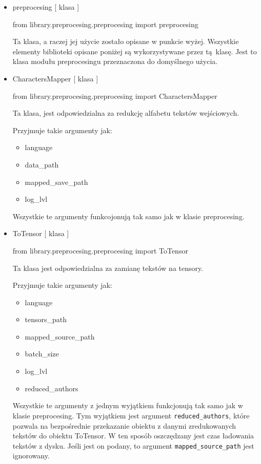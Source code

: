 \begin{itemize}
	
\item  {preprocesing [ klasa ] }
\begin{import}
from library.preprocesing.preprocesing import preprocesing
\end{import}

Ta klasa, a raczej jej użycie zostało opisane w punkcie wyżej. Wszystkie elementy biblioteki opisane
poniżej są wykorzystywane przez tą klasę. Jest to klasa modułu preprocesingu przeznaczona
do domyślnego użycia.

\item  {CharactersMapper [ klasa ] }
\begin{import}
from library.preprocesing.preprocesing import CharactersMapper
\end{import}
Ta klasa, jest odpowiedzialna za redukcję alfabetu tekstów wejściowych. 

Przyjmuje takie argumenty jak: 

\begin{itemize}
	\item language
	\item data\_path
	\item mapped\_save\_path
	\item log\_lvl
\end{itemize}

Wszystkie te argumenty funkcojonują tak samo jak w klasie preprocesing.


\item  {ToTensor [ klasa ] }
\begin{import}
from library.preprocesing.preprocesing import ToTensor
\end{import}
Ta klasa jest odpowiedzialna za zamianę tekstów na tensory.

Przyjmuje takie argumenty jak: 

\begin{itemize}
	\item language
	\item tensors\_path
	\item mapped\_source\_path
	\item batch\_size
	\item log\_lvl
	\item reduced\_authors
\end{itemize}

Wszystkie te argumenty z jednym wyjątkiem funkcjonują tak samo jak w klasie preprocesing. 
Tym wyjątkiem jest argument \texttt{reduced\_authors}, które pozwala na bezpośrednie przekazanie obiektu z danymi 
zredukowanych tekstów do obiektu ToTensor. W ten sposób oszczędzany jest czas ładowania tekstów z 
dysku. Jeśli jest on podany, to argument \texttt{mapped\_source\_path} jest ignorowany.

\end{itemize}

